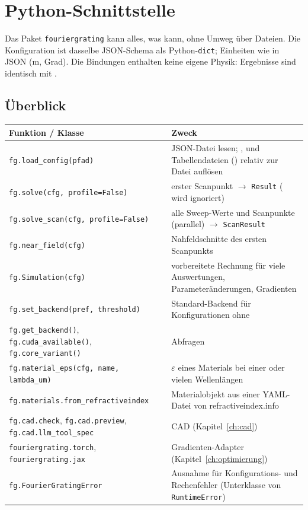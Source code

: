 \chapter{Python-Schnittstelle}\label{ch:python}
%

Das Paket \texttt{fouriergrating} kann alles, was  kann, ohne Umweg über Dateien. Die Konfiguration ist
dasselbe JSON-Schema als Python-\texttt{dict}; Einheiten wie in JSON (\textmu m, Grad). Die Bindungen enthalten keine
eigene Physik: Ergebnisse sind identisch mit .

\section{Überblick}
\begin{center}
\small
\begin{tabularx}{\linewidth}{lY}
\toprule
Funktion / Klasse & Zweck \\
\midrule
\texttt{fg.load\_config(pfad)} & JSON-Datei lesen; ,  und Tabellendateien
() relativ zur Datei auflösen \\
\texttt{fg.solve(cfg, profile=False)} & erster Scanpunkt $\to$ \texttt{Result} ( wird ignoriert) \\
\texttt{fg.solve\_scan(cfg, profile=False)} & alle Sweep-Werte und Scanpunkte (parallel) $\to$ \texttt{ScanResult} \\
\texttt{fg.near\_field(cfg)} & Nahfeldschnitte des ersten Scanpunkts \\
\texttt{fg.Simulation(cfg)} & vorbereitete Rechnung für viele Auswertungen, Parameteränderungen, Gradienten \\
\texttt{fg.set\_backend(pref, threshold)} & Standard-Backend für Konfigurationen ohne  \\
\texttt{fg.get\_backend()}, \texttt{fg.cuda\_available()}, \texttt{fg.core\_variant()} & Abfragen \\
\texttt{fg.material\_eps(cfg, name, lambda\_um)} & $\varepsilon$ eines Materials bei einer oder vielen Wellenlängen \\
\texttt{fg.materials.from\_refractiveindex} & Materialobjekt aus einer YAML-Datei von refractiveindex.info \\
\texttt{fg.cad.check}, \texttt{fg.cad.preview}, \texttt{fg.cad.llm\_tool\_spec} & CAD (Kapitel~\ref{ch:cad}) \\
\texttt{fouriergrating.torch}, \texttt{fouriergrating.jax} & Gradienten-Adapter (Kapitel~\ref{ch:optimierung}) \\
\texttt{fg.FourierGratingError} & Ausnahme für Konfigurations- und Rechenfehler (Unterklasse von \texttt{RuntimeError}) \\
\bottomrule
\end{tabularx}
\end{center}

